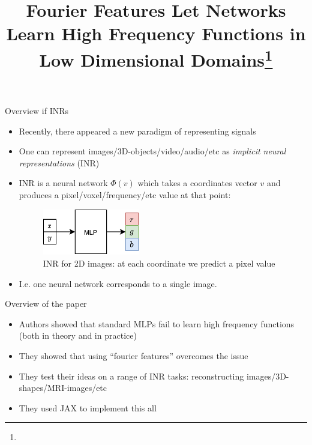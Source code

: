\documentclass[handout, 10pt]{beamer}
\title{Fourier Features Let Networks Learn High Frequency Functions in Low Dimensional Domains\footnote{\citepaper{FourierINR}}}
\begin{document}
\begin{frame}
    \titlepage
\end{frame}

\begin{frame}{Overview if INRs}
    \begin{itemize}
        \item\pause Recently, there appeared a new paradigm of representing signals
        \item\pause One can represent images/3D-objects/video/audio/etc as \textit{implicit neural representations} (INR)
        \item\pause INR is a neural network $\Phi(v)$ which takes a coordinates vector $v$ and produces a pixel/voxel/frequency/etc value at that point:
        \begin{figure}
            \centering
            \includegraphics[width=0.4\textwidth]{images/inr}
            \caption{INR for 2D images: at each coordinate we predict a pixel value}
        \end{figure}
        \item\pause I.e. one neural network corresponds to a single image.
    \end{itemize}
\end{frame}

\begin{frame}{Overview of the paper}
\begin{itemize}
    \item\pause Authors showed that standard MLPs fail to learn high frequency functions (both in theory and in practice)
    \item\pause They showed that using ``fourier features'' overcomes the issue
    \item\pause They test their ideas on a range of INR tasks: reconstructing images/3D-shapes/MRI-images/etc
    \item\pause They used JAX to implement this all
\end{itemize}
\end{frame}
\end{document}
